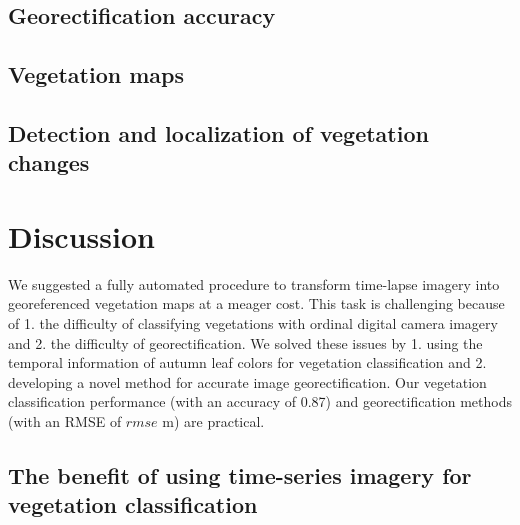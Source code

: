 \documentclass{article}
\begin{document}
\hypertarget{georectification-accuracy}{%
\subsection{Georectification accuracy}\label{georectification-accuracy}}

\hypertarget{vegetation-maps}{%
\subsection{Vegetation maps}\label{vegetation-maps}}

\hypertarget{detection-and-localization-of-vegetation-changes}{%
\subsection{Detection and localization of vegetation
changes}\label{detection-and-localization-of-vegetation-changes}}

\hypertarget{discussion}{%
\section{Discussion}\label{discussion}}

We suggested a fully automated procedure to transform time-lapse imagery
into georeferenced vegetation maps at a meager cost. This task is
challenging because of 1. the difficulty of classifying vegetations with
ordinal digital camera imagery and 2. the difficulty of
georectification. We solved these issues by 1. using the temporal
information of autumn leaf colors for vegetation classification and 2.
developing a novel method for accurate image georectification. Our
vegetation classification performance (with an accuracy of 0.87) and
georectification methods (with an RMSE of \(rmse\) m) are practical.

\hypertarget{the-benefit-of-using-time-series-imagery-for-vegetation-classification}{%
\subsection{The benefit of using time-series imagery for vegetation
classification}\label{the-benefit-of-using-time-series-imagery-for-vegetation-classification}}
\end{document}
